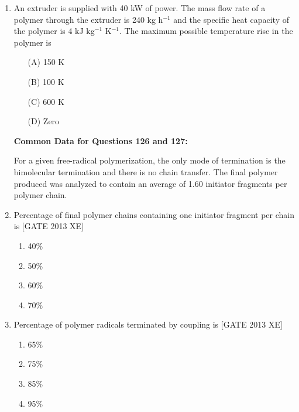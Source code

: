 \documentclass[journal,12pt,onecolumn]{IEEEtran}
\theoremstyle{remark}
\begin{document}
\begin{enumerate}
\begin{multicols}{4}
\begin{enumerate}
    \item[(A)] 5.67
    \item[(B)] 15.3
    \item[(C)] 2.88
    \item[(D)] 0.667
\end{enumerate}
\end{multicols}

\item An extruder is supplied with 40 kW of power. The mass flow rate of a polymer through the extruder is 240 kg h$^{-1}$ and the specific heat capacity of the polymer is 4 kJ kg$^{-1}$ K$^{-1}$. The maximum possible temperature rise in the polymer is

\begin{multicols}{4}
\begin{enumerate}
    \item[(A)] 150 K
    \item[(B)] 100 K
    \item[(C)] 600 K
    \item[(D)] Zero
\end{enumerate}
\end{multicols}

\textbf{Common Data for Questions 126 and 127:}

For a given free-radical polymerization, the only mode of termination is the bimolecular termination and there is no chain transfer. The final polymer produced was analyzed to contain an average of 1.60 initiator fragments per polymer chain.


    \item Percentage of final polymer chains containing one initiator fragment per chain is \hfill [GATE 2013 XE]
    \begin{multicols}{4}
    \begin{enumerate}
        \item 40\%
        \item 50\%
        \item 60\%
        \item 70\%
    \end{enumerate}
    \end{multicols}

    \item Percentage of polymer radicals terminated by coupling is \hfill [GATE 2013 XE]
    \begin{multicols}{4}
    \begin{enumerate}
        \item 65\%
        \item 75\%
        \item 85\%
        \item 95\%
    \end{enumerate}
    \end{multicols}



\end{enumerate}
\end{document}
